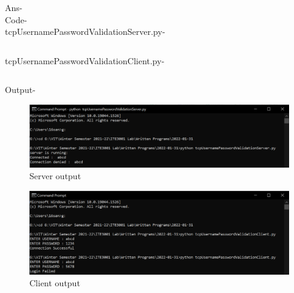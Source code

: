 \documentclass[12pt]{article}
\begin{document}
Ans- \\ Code- \\ tcpUsernamePasswordValidationServer.py-\inputminted{python}{tcpUsernamePasswordValidationServer.py}
tcpUsernamePasswordValidationClient.py- \inputminted{python}{tcpUsernamePasswordValidationClient.py}
Output-
\begin{figure}[h] %
\centering
\includegraphics[width=\textwidth]{tcpUsernamePasswordValidationServer.png}
\caption{Server output}
\end{figure}
\begin{figure}[h] %
\centering
\includegraphics[width=\textwidth]{tcpUsernamePasswordValidationClient.png}
\caption{Client output}
\end{figure}
\newpage
\end{document}
